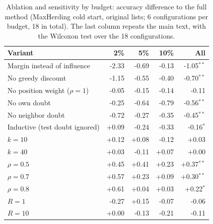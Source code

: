\begin{table}[t]
\centering
\caption{Ablation and sensitivity by budget: accuracy difference to the full method (MaxHerding cold start, original lists; 6 configurations per budget, 18 in total). The last column repeats the main text, with the Wilcoxon test over the 18 configurations.}
\label{tab:supp-ablation-budget}
\footnotesize
\begin{tabular}{lrrrr}
\toprule
Variant & 2\% & 5\% & 10\% & All \\
\midrule
Margin instead of influence & -2.33 & -0.69 & -0.13 & -1.05$^{**}$ \\
No greedy discount & -1.15 & -0.55 & -0.40 & -0.70$^{**}$ \\
No position weight ($\rho=1$) & -0.05 & -0.15 & -0.14 & -0.11 \\
No own doubt & -0.25 & -0.64 & -0.79 & -0.56$^{**}$ \\
No neighbor doubt & -0.72 & -0.27 & -0.35 & -0.45$^{**}$ \\
Inductive (test doubt ignored) & +0.09 & -0.24 & -0.33 & -0.16$^{*}$ \\
$k=10$ & +0.12 & +0.08 & -0.12 & +0.03 \\
$k=40$ & +0.03 & -0.11 & +0.07 & +0.00 \\
$\rho=0.5$ & +0.45 & +0.41 & +0.23 & +0.37$^{**}$ \\
$\rho=0.7$ & +0.57 & +0.23 & +0.09 & +0.30$^{**}$ \\
$\rho=0.8$ & +0.61 & +0.04 & +0.03 & +0.22$^{*}$ \\
$R=1$ & -0.27 & +0.15 & -0.07 & -0.06 \\
$R=10$ & +0.00 & -0.13 & -0.21 & -0.11 \\
\bottomrule
\end{tabular}
\end{table}
